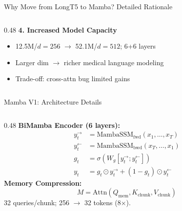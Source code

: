 \documentclass[10pt, aspectratio=169]{beamer}
\begin{document}
\begin{frame}{Why Move from LongT5 to Mamba? Detailed Rationale}
\begin{columns}[T]
\begin{column}{0.48\textwidth}
      \vspace{0.05cm}
      \textbf{4. Increased Model Capacity}
      \begin{itemize}\setlength{\itemsep}{0pt}
        \item 12.5M/$d{=}256$ $\rightarrow$ 52.1M/$d{=}512$; 6+6 layers
        \item Larger dim $\rightarrow$ richer medical language modeling
        \item \textcolor{amber}{Trade-off: cross-attn bug limited gains}
      \end{itemize}
    \end{column}
  \end{columns}
\end{frame}

\begin{frame}{Mamba V1: Architecture Details}
  \small
  \begin{columns}[T]
    \begin{column}{0.48\textwidth}
      \textbf{BiMamba Encoder (6 layers):}
      \vspace{-0.15cm}
      \begin{align}
        y_t^{\rightarrow} &= \text{MambaSSM}_{\text{fwd}}(x_1, \ldots, x_T) \nonumber \\
        y_t^{\leftarrow} &= \text{MambaSSM}_{\text{bwd}}(x_T, \ldots, x_1) \nonumber \\
        g_t &= \sigma(W_g[y_t^{\rightarrow}; y_t^{\leftarrow}]) \nonumber \\
        y_t &= g_t \odot y_t^{\rightarrow} + (1 - g_t) \odot y_t^{\leftarrow} \nonumber
      \end{align}
      \vspace{-0.2cm}
      \textbf{Memory Compression:}
      \begin{equation}
        M = \text{Attn}(Q_{\text{mem}}, K_{\text{chunk}}, V_{\text{chunk}}) \nonumber
      \end{equation}
      \vspace{-0.2cm}
      {\scriptsize 32 queries/chunk; 256 $\rightarrow$ 32 tokens (8$\times$).}


\end{column}
\end{columns}
\end{frame}
\end{document}
